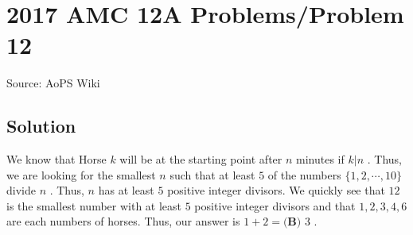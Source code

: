 \documentclass[12pt]{article}
\begin{document}
\section*{{2017 AMC 12A Problems/Problem 12}}
Source: AoPS Wiki

\subsection*{Solution}
We know that Horse $k$ will be at the starting point after $n$ minutes if $k|n$ . Thus, we are looking for the smallest $n$ such that at least $5$ of the numbers $\{1,2,\cdots,10\}$ divide $n$ . Thus, $n$ has at least $5$ positive integer divisors. We quickly see that $12$ is the smallest number with at least $5$ positive integer divisors and that $1,2,3,4,6$ are each numbers of horses. Thus, our answer is $1+2=\boxed{\textbf{(B) } 3}$ .
\end{document}
